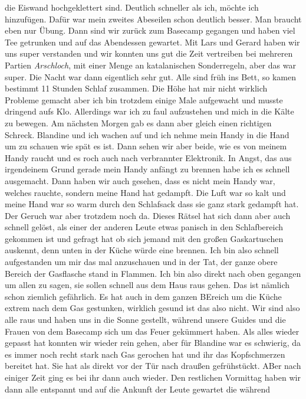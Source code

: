 \documentclass[11pt]{book}
\begin{document}
die Eiswand hochgeklettert sind. Deutlich schneller als ich, möchte ich hinzufügen. Dafür war mein zweites Abeseilen schon deutlich besser. Man braucht eben 
nur Übung. Dann sind wir zurück zum Basecamp gegangen und haben viel Tee getrunken und auf das Abendessen gewartet. Mit Lars und Gerard haben wir uns super 
verstanden und wir konnten uns gut die Zeit vertreiben bei mehreren Partien \emph{Arschloch}, mit einer Menge an katalanischen Sonderregeln, aber das war super. 
Die Nacht war dann eigentlich sehr gut. Alle sind früh ins Bett, so kamen bestimmt 11 Stunden Schlaf zusammen. Die Höhe hat mir nicht wirklich Probleme 
gemacht aber ich bin trotzdem einige Male aufgewacht und musste dringend aufs Klo. Allerdings war ich zu faul aufzustehen und mich in die Kälte zu bewegen. 
Am nächsten Morgen gab es dann aber gleich einen richtigen Schreck. Blandine und ich wachen auf und ich nehme mein Handy in die Hand um zu schauen wie 
spät es ist. Dann sehen wir aber beide, wie es von meinem Handy raucht und es roch auch nach verbrannter Elektronik. In Angst, das aus irgendeinem Grund 
gerade mein Handy anfängt zu brennen habe ich es schnell ausgemacht. Dann haben wir auch gesehen, dass es nicht mein Handy war, welches rauchte, sondern 
meine Hand hat gedampft. Die Luft war so kalt und meine Hand war so warm durch den Schlafsack dass sie ganz stark gedampft hat. Der Geruch war aber 
trotzdem noch da. Dieses Rätsel hat sich dann aber auch schnell gelöst, als einer der anderen Leute etwas panisch in den Schlafbereich gekommen ist und 
gefragt hat ob sich jemand mit den großen Gaskartuschen auskennt, denn unten in der Küche würde eine brennen. Ich bin also schnell aufgestanden um mir 
das mal anzuschauen und in der Tat, der ganze obere Bereich der Gasflasche stand in Flammen. Ich bin also direkt nach oben gegangen um allen zu sagen, sie 
sollen schnell aus dem Haus raus gehen. Das ist nämlich schon ziemlich gefährlich. Es hat auch in dem ganzen BEreich um die Küche extrem nach dem 
Gas gestunken, wirklich gesund ist das also nicht. Wir sind also alle raus und haben uns in die Sonne gestellt, während unsere Guides und die Frauen von dem 
Basecamp sich um das Feuer gekümmert haben. Als alles wieder gepasst hat konnten wir wieder rein gehen, aber für Blandine war es schwierig, da es immer 
noch recht stark nach Gas gerochen hat und ihr das Kopfschmerzen bereitet hat. Sie hat als direkt vor der Tür nach draußen gefrühstückt. ABer nach 
einiger Zeit ging es bei ihr dann auch wieder. Den restlichen Vormittag haben wir dann alle entspannt und auf die Ankunft der Leute gewartet die während 
\end{document}
